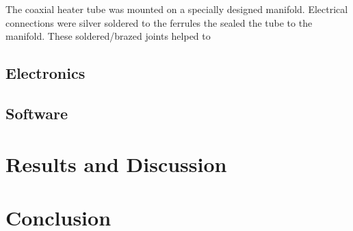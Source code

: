 \documentclass[aip,rsi,reprint,graphicx]{revtex4-1} %
\begin{document}
The coaxial heater tube was mounted on a specially designed manifold. Electrical connections were silver soldered to the ferrules the sealed the tube to the manifold. These soldered/brazed joints helped to  

\subsection{Electronics}

\subsection{Software}

\section{Results and Discussion}

\section{Conclusion}
\

%
%

%
\end{document}
